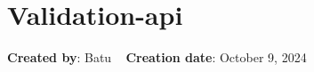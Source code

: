 \chapter{Validation-\/api}
\hypertarget{index}{}\label{index}
\label{index_md_Readme}%
%
 {\bfseries{Created by}}\+: Batu ~\newline
 {\bfseries{Creation date}}\+: October 9, 2024 ~\newline
 
